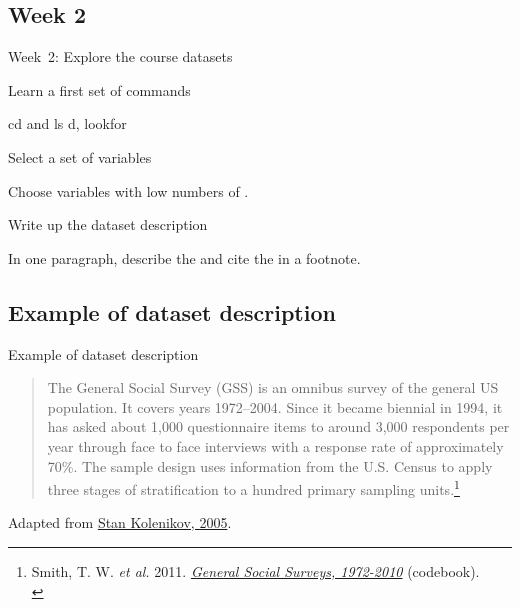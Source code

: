 \documentclass[t]{beamer}
\begin{document}
    \subsection*{Week 2}
	\begin{frame}[c]{Week~2: Explore the course datasets}
		
		\begin{block}{Learn a first set of commands}

			cd and ls
			d, lookfor

		\end{block}

		\begin{block}{Select a set of variables}

			Choose variables with low numbers of .

		\end{block}

		\begin{alertblock}{Write up the dataset description}

			In one paragraph, describe the  and cite the  in a footnote.

		\end{alertblock}
				
	\end{frame}

	\subsection*{Example of dataset description}
	\begin{frame}[c]{Example of dataset description}
		
		\begin{quote}
			 The General Social Survey (GSS) is an omnibus survey of the general US population. It covers years 1972--2004. Since it became biennial in 1994, it has asked about 1,000 questionnaire items to around 3,000 respondents per year through face to face interviews with a response rate of approximately 70\%. The sample design uses information from the U.S. Census to apply three stages of stratification to a hundred primary sampling units.\footnote{Smith, T. W. \emph{et al.} 2011. \emph{\href{http://publicdata.norc.org/GSS/DOCUMENTS/BOOK/GSS_Codebook_intro.pdf}{General Social Surveys, 1972-2010}} (codebook).\\[1em]}			
		\end{quote}
		
		\hfill Adapted from \href{http://www.unc.edu/~skolenik/talks/LinearRegressionPlus.pdf}{Stan Kolenikov, 2005}.

	\end{frame}
	
\end{document}
